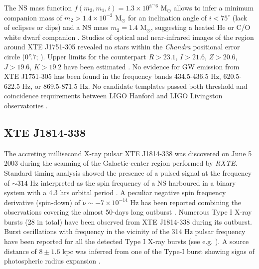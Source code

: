 \documentclass[graybox]{svmult}
\def \chandra {{\em Chandra\xspace}}
\def \rxte {{\em RXTE\xspace}}
\begin{document}
The NS mass function $f(m_2,m_1,i) = 1.3\times10^{â6}$ M$_\odot$ allows to infer a minimum companion mass of $m_2>1.4\times10^{-2}$ M$_\odot$ for an inclination angle of $i<75^\circ$ (lack of eclipses or dips) and a NS mass $m_2=1.4$ M$_\odot$, suggesting a heated He or C/O white dwarf companion \cite{Deloye2003}.
Studies of optical and near-infrared images of the region around XTE J1751-305 revealed no stars within the \chandra{} positional error circle (0''.7; \cite{Markwardt2002}). Upper limits for the counterpart $R>23.1$, $I>21.6$, $Z>20.6$, $J>19.6$, $K>19.2$ have been estimated \cite{Jonker2003}. No evidence for GW emission from XTE J1751-305 has been found in the frequency bands 434.5-436.5 Hz, 620.5-622.5 Hz, or 869.5-871.5 Hz. No candidate templates passed both threshold and coincidence requirements between LIGO Hanford and LIGO Livingston observatories \cite{Meadors2017}. 

\subsection{XTE J1814-338}      

The accreting millisecond X-ray pulsar XTE J1814-338 was discovered on June 5 2003 during the scanning of the Galactic-center region performed by \rxte{}. Standard timing analysis showed the presence of a pulsed signal at the frequency of $\sim314$ Hz interpreted as the spin frequency of a NS harboured in a binary system with a 4.3 hrs orbital period \cite{Markwardt2003}. A peculiar negative spin frequency derivative (spin-down) of $\dot{\nu}\sim -7\times 10^{-14}$ Hz has been reported combining the observations covering the almost 50-days long outburst \cite{Papitto2007}.   
Numerous Type I X-ray bursts (28 in total) have been observed from XTE J1814-338 during its outburst. Burst oscillations with frequency in the vicinity of the 314 Hz pulsar frequency have been reported for all the detected Type I X-ray bursts  (see e.g. \cite{Strohmayer2003,Watts2005}).  A source distance of $8\pm1.6$ kpc was inferred from one of the Type-I burst showing signs of photospheric radius expansion \cite{Strohmayer2003}.
\end{document}
